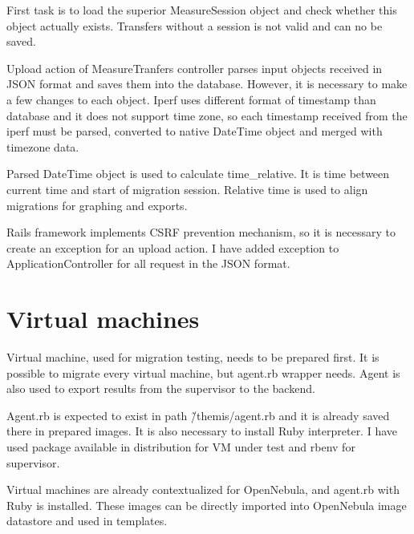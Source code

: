 First task is to load the superior MeasureSession object and check whether this object actually exists. Transfers without a session is not valid and can no be saved.

Upload action of MeasureTranfers controller parses input objects received in \Ac{JSON} format and saves them into the database. However, it is necessary to make a few changes to each object. Iperf uses different format of timestamp than database and it does not support time zone, so each timestamp received from the iperf must be parsed, converted to native DateTime object and merged with timezone data. 

Parsed DateTime object is used to calculate time\_relative. It is time between current time and start of migration session. Relative time is used to align migrations for graphing and exports.

Rails framework implements \Ac{CSRF} prevention mechanism, so it is necessary to create an exception for an upload action. I have added exception to ApplicationController for all request in the \Ac{JSON} format.


\section{Virtual machines}
Virtual machine, used for migration testing, needs to be prepared first. It is possible to migrate every virtual machine, but agent.rb wrapper needs. Agent is also used to export results from the supervisor to the backend.

Agent.rb is expected to exist in path {\~/themis/agent.rb} and it is already saved there in prepared images. It is also necessary to install Ruby interpreter. I have used package available in distribution for \Ac{VM} under test and rbenv for supervisor.

Virtual machines  are already contextualized for OpenNebula, and agent.rb with Ruby is installed. These images can be directly imported into OpenNebula image datastore and used in templates.

